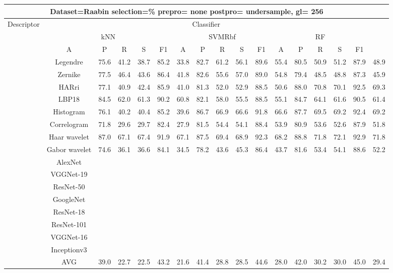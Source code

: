 \documentclass[12pt,italian]{article}
\begin{document}
\begin{tiny}
\begin{longtable}{lcccccccccccccccc}
\toprule
\multicolumn{16}{c}{Dataset=Raabin selection=\% prepro= none postpro= undersample, gl= 256} \\ 
\toprule
Descriptor & \multicolumn{15}{c}{Classifier} \\ 
& \multicolumn{5}{c}{kNN} & \multicolumn{5}{c}{SVMRbf} & \multicolumn{5}{c}{RF} \\ 
& A & P & R & S & F1 & A & P & R & S & F1 & A & P & R & S & F1 \\ 
\midrule
& Legendre & 75.6 & 41.2 & 38.7 & 85.2 & 33.8 & 82.7 & 61.2 & 56.1 & 89.6 & 55.4 & 80.5 & 50.9 & 51.2 & 87.9 & 48.9 \\ 
& Zernike & 77.5 & 46.4 & 43.6 & 86.4 & 41.8 & 82.6 & 55.6 & 57.0 & 89.0 & 54.8 & 79.4 & 48.5 & 48.8 & 87.3 & 45.9 \\ 
& HARri & 77.1 & 40.9 & 42.4 & 85.9 & 41.0 & 81.3 & 52.0 & 52.9 & 88.5 & 50.6 & 88.0 & 70.8 & 70.1 & 92.5 & 69.3 \\ 
& LBP18 & 84.5 & 62.0 & 61.3 & 90.2 & 60.8 & 82.1 & 58.0 & 55.5 & 88.5 & 55.1 & 84.7 & 64.1 & 61.6 & 90.5 & 61.4 \\ 
& Histogram & 76.1 & 40.2 & 40.4 & 85.2 & 39.6 & 86.7 & 66.9 & 66.6 & 91.8 & 66.6 & 87.7 & 69.5 & 69.2 & 92.4 & 69.2 \\ 
& Correlogram & 71.8 & 29.6 & 29.7 & 82.4 & 27.9 & 81.5 & 54.4 & 54.1 & 88.4 & 53.9 & 80.9 & 53.6 & 52.6 & 87.9 & 51.8 \\ 
& Haar wavelet & 87.0 & 67.1 & 67.4 & 91.9 & 67.1 & 87.5 & 69.4 & 68.9 & 92.3 & 68.2 & 88.8 & 71.8 & 72.1 & 92.9 & 71.8 \\ 
& Gabor wavelet & 74.6 & 36.1 & 36.6 & 84.1 & 34.5 & 78.2 & 43.6 & 45.3 & 86.4 & 43.7 & 81.6 & 53.4 & 54.1 & 88.6 & 52.2 \\ 
& AlexNet \\ 
& VGGNet-19 \\ 
& ResNet-50 \\ 
& GoogleNet \\ 
& ResNet-18 \\ 
& ResNet-101 \\ 
& VGGNet-16 \\ 
& Inceptionv3 \\ 
\hline
& AVG & 39.0 & 22.7 & 22.5 & 43.2 & 21.6 & 41.4 & 28.8 & 28.5 & 44.6 & 28.0 & 42.0 & 30.2 & 30.0 & 45.0 & 29.4 \\ 
\hline
\bottomrule
\end{longtable} 


\end{tiny}
\end{document}

